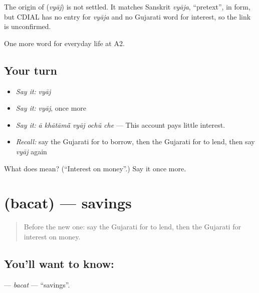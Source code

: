 \begin{cousinweb}
The origin of \textbf{} (\emph{vyāj}) is not settled. It matches Sanskrit \emph{vyāja}, \textquotedblleft{}pretext\textquotedblright{}, in form, but CDIAL has no entry for \emph{vyāja} and no Gujarati word for interest, so the link is unconfirmed.
\end{cousinweb}

\begin{grammarlens}[title={What you've built}]
One more word for everyday life at A2.
\end{grammarlens}

\subsection*{Your turn}
\begin{itemize}
\raggedright
  \item \emph{Say it:} \emph{vyāj}
  \item \emph{Say it:} \emph{vyāj}, once more
  \item \emph{Say it:} \emph{ā khātāmā̃ vyāj ochũ che} — This account pays little interest.
  \item \emph{Recall:} say the Gujarati for to borrow, then the Gujarati for to lend, then say \emph{vyāj} again
\end{itemize}

\begin{tcolorbox}[breakable,colback=teal!4,colframe=teal!35!black,title={Before you move on}]
What does  mean? (\textquotedblleft{}Interest on money\textquotedblright{}.) Say it once more.
\end{tcolorbox}
\section[\texorpdfstring{\gu{બચત} (bacat)}{બચત (bacat)}]{ (bacat) — savings}

\label{lesson:GU-C191-bacat}



\begin{quote}
Before the new one: say the Gujarati for to lend, then the Gujarati for interest on money.
\end{quote}

\subsection*{You'll want to know: }
\textbf{} — \emph{bacat} — \textquotedblleft{}savings\textquotedblright{}.

